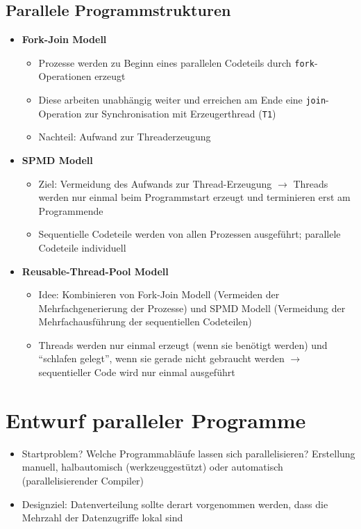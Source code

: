 \subsection{Parallele Programmstrukturen}
\begin{itemize}
	\item \textbf{Fork-Join Modell}
	\begin{itemize}
		\item Prozesse werden zu Beginn eines parallelen Codeteils durch \texttt{fork}-Operationen erzeugt
		\item Diese arbeiten unabhängig weiter und erreichen am Ende eine \texttt{join}-Operation zur Synchronisation mit Erzeugerthread (\texttt{T1})
		\item Nachteil: Aufwand zur Threaderzeugung
	\end{itemize}
	\item \textbf{SPMD Modell}
	\begin{itemize}
		\item Ziel: Vermeidung des Aufwands zur Thread-Erzeugung \(\rightarrow\) Threads werden nur einmal beim Programmstart erzeugt und terminieren erst am Programmende
		\item Sequentielle Codeteile werden von allen Prozessen ausgeführt; parallele Codeteile individuell
	\end{itemize}
	\item \textbf{Reusable-Thread-Pool Modell}
	\begin{itemize}
		\item Idee: Kombinieren von Fork-Join Modell (Vermeiden der Mehrfachgenerierung der Prozesse) und SPMD Modell (Vermeidung der Mehrfachausführung der sequentiellen Codeteilen)
		\item Threads werden nur einmal erzeugt (wenn sie benötigt werden) und "`schlafen gelegt"', wenn sie gerade nicht gebraucht werden \(\rightarrow\) sequentieller Code wird nur einmal ausgeführt
	\end{itemize}
\end{itemize}



\section{Entwurf paralleler Programme}
\begin{itemize}
	\item Startproblem? Welche Programmabläufe lassen sich parallelisieren? Erstellung manuell, halbautomisch (werkzeuggestützt) oder automatisch (parallelisierender Compiler)
	\item Designziel: Datenverteilung sollte derart vorgenommen werden, dass die Mehrzahl der Datenzugriffe lokal sind
\end{itemize}

